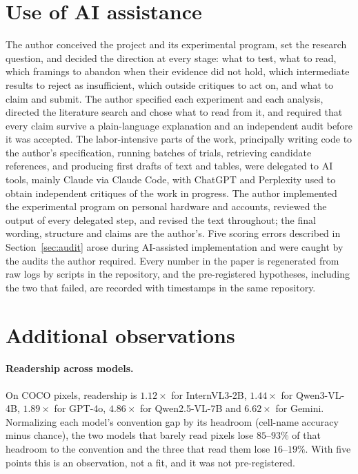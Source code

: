 \documentclass{article}
\begin{document}
\section*{Use of AI assistance}

The author conceived the project and its
experimental program, set the research question, and decided the direction at
every stage: what to test, what to read, which framings to abandon when their
evidence did not hold, which intermediate results to reject as insufficient,
which outside critiques to act on, and what to claim and submit. The author
specified each experiment and each analysis, directed the literature search and
chose what to read from it, and required that every claim survive a plain-language
explanation and an independent audit before it was accepted. The labor-intensive
parts of the work, principally writing code to the author's specification, running
batches of trials, retrieving candidate references, and producing first drafts of
text and tables, were delegated to AI tools, mainly Claude via Claude Code, with
ChatGPT and Perplexity used to obtain independent critiques of the work in
progress. The author implemented the experimental program on personal hardware and
accounts, reviewed the output of every delegated step, and revised the text
throughout; the final wording, structure and claims are the author's. Five scoring
errors described in Section~\ref{sec:audit} arose during AI-assisted
implementation and were caught by the audits the author required. Every number in the paper is regenerated from raw logs by scripts in the repository, and the
pre-registered hypotheses, including the two that failed, are recorded with
timestamps in the same repository.




\appendix
\section{Additional observations}
\label{app:extra}

\paragraph{Readership across models.} On COCO pixels, readership is $1.12\times$
for InternVL3-2B, $1.44\times$ for Qwen3-VL-4B, $1.89\times$ for GPT-4o,
$4.86\times$ for Qwen2.5-VL-7B and $6.62\times$ for Gemini. Normalizing each
model's convention gap by its headroom (cell-name accuracy minus chance), the two
models that barely read pixels lose $85$--$93\%$ of that headroom to the
convention and the three that read them lose $16$--$19\%$. With five points this
is an observation, not a fit, and it was not pre-registered.
\end{document}
